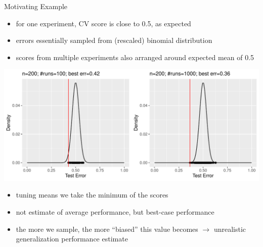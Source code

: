 \begin{frame}[c,allowframebreaks]{Motivating Example}
    \begin{itemize}
    \item for one experiment, CV score is close to 0.5, as expected
    \item errors essentially sampled from (rescaled) binomial distribution
    \item scores from multiple experiments also arranged around expected mean of 0.5
    \end{itemize}

    \framebreak

    \begin{center}
        \includegraphics[height=.55\textheight]{dist-tuning2}
    \end{center}

    \begin{itemize}
    \item tuning means we take the minimum of the scores
    \item not estimate of average performance, but best-case performance
    \item the more we sample, the more ``biased'' this value becomes
        $\rightarrow$ unrealistic generalization performance estimate
    \end{itemize}
    \end{frame}

